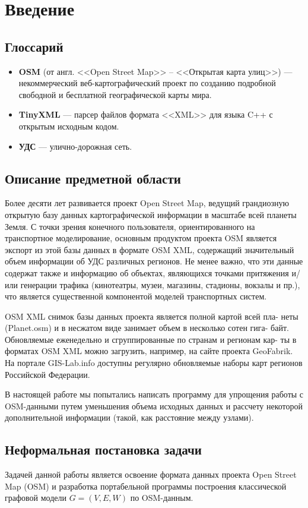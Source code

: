 \chapter{Введение}
\section{Глоссарий}
\begin{itemize}
  \item \textbf{OSM} (от англ. <<Open Street Map>> -- <<Открытая карта улиц>>) --- некоммерческий веб-картографический проект по созданию подробной свободной и бесплатной географической карты мира.
  \item \textbf{TinyXML} --- парсер файлов формата <<XML>> для языка C++ с открытым исходным кодом.
  \item \textbf{УДС} --- улично-дорожная сеть.
\end{itemize}

\section{Описание предметной области}
\noindent\indent Более десяти лет развивается проект Open Street Map,
ведущий грандиозную открытую базу данных картографической информации в масштабе
всей планеты Земля. С точки зрения конечного пользователя, ориентированного на
транспортное моделирование, основным продуктом проекта OSM является экспорт из
этой базы данных в формате OSM XML, содержащий значительный объем информации об
УДС различных регионов. Не менее важно, что эти данные содержат также и информацию
об объектах, являющихся точками притяжения и/или генерации трафика (кинотеатры,
музеи, магазины, стадионы, вокзалы и пр.), что является существенной компонентой
моделей транспортных систем.\par
  OSM XML снимок базы данных проекта является полной картой всей пла-
неты (Planet.osm) и в несжатом виде занимает объем в несколько сотен гига-
байт. Обновляемые еженедельно и сгруппированные по странам и регионам кар-
ты в форматах OSM XML можно загрузить, например, на сайте проекта GeoFabrik.
На портале GIS-Lab.info доступны регулярно обновляемые наборы карт
регионов Российской Федерации.\par
  В настоящей работе мы попытались написать программу для упрощения
работы с OSM-данными путем уменьшения объема исходных данных и рассчету некоторой
дополнительной информации (такой, как расстояние между узлами).
\newpage
\section{Неформальная постановка задачи}
\noindent\indent Задачей данной работы является освоение формата данных проекта
Open Street Map (OSM) и разработка портабельной программы построения классической
графовой модели $G = (V, E, W)$ по OSM-данным.
